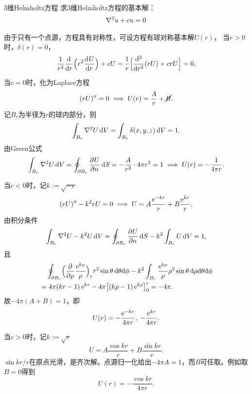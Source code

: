 \begin{example}{3维Helmholtz方程}{}
	求3维Helmholtz方程的基本解：
	\[
		\laplacian u + cu = 0
	\]
	
	由于只有一个点源，方程具有对称性，可设方程有球对称基本解$U(r)$，
	当$r > 0$时，$\delta(r) = 0$，
	\[
		\frac1{r^2}\dd r\Bigp{r^2\dv Ur} + cU = \frac1r\Bigb{\dd[2]r(rU) + crU} = 0,
	\]
	
	当$c = 0$时，化为Laplace方程
	\[
		(rU)'' = 0 \implies U(r) = \frac Ar + \cancel{B}.
	\]
	记$B_r$为半径为$r$的球内部分，则
	\[
		\int_{B_r}\laplacian U\d V = \int_{B_r}\delta(x,y,z)\d V = 1.
	\]
	由Green公式
	\[
		\int_{B_r}\laplacian U\d V = \oint_{\p B_r}\pv Un\d S = -\frac A{r^2} \cdot 4\pi r^2 = 1 \implies U(r) = -\frac1{4\pi r}.
	\]
	
	当$c < 0$时，记$k := \sqrt{-c}$
	\[
		(rU)'' - k^2rU = 0 \implies U = A\frac{\e^{-kr}}r + B\frac{\e^{kr}}r.
	\]
	由积分条件
	\[
		\int_{B_r}\laplacian U - k^2U\d V = \oint_{\p B_r}\pv Un\d S - k^2\int_{B_r}U\d V = 1,
	\]
	且
	\begin{align*}
		&\quad\oint_{\p B_r}\Bigp{\pp\rho\frac{\e^{k\rho}}\rho}_rr^2\sin\theta\d\theta\nd\phi - k^2\int_{B_r}\frac{\e^{k\rho}}\rho\rho^2\sin\theta\d\rho\nd\theta\nd\phi\\
		&= 4\pi(kr - 1)\e^{kr} - 4\pi\bigb{(k\rho - 1)\e^{k\rho}}_0^r = -4\pi.
	\end{align*}
	故$-4\pi(A + B) = 1$，即
	\begin{equation}
		\label{eq:mmp-modified-helmholtz-fundamental}
		U(r) = -\frac{\e^{-kr}}{4\pi r},\; -\frac{\e^{kr}}{4\pi r}.
	\end{equation}
	
	当$c > 0$时，记$k := \sqrt c$
	\[
		U = A\frac{\cos kr}r + B\frac{\sin kr}r.
	\]
	$\sin kr/r$在原点光滑，是齐次解。点源归一化给出$-4\pi A = 1$，而$B$可任取。例如取$B = 0$得到
	\begin{equation}
		\label{eq:mmp-real-helmholtz-fundamental}
		U(r) = -\frac{\cos kr}{4\pi r}.
	\end{equation}
\end{example}
